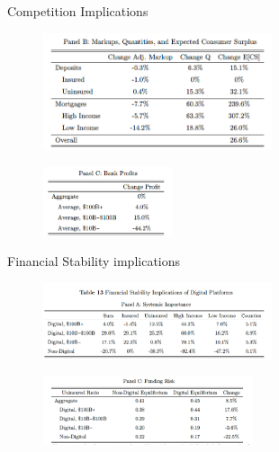 \documentclass[notes,10pt, aspectratio=169]{beamer}
\begin{document}
            \begin{frame}{Competition Implications}\label{comp_implications}   
                \begin{figure}
                    \centering
                    \includegraphics[width=0.6\textwidth]{imgs/tab12b.png}
                \end{figure}
                
                \begin{figure}
                    \centering
                    \includegraphics[width=0.34\textwidth]{imgs/tab12c.png}
                \end{figure}
            \end{frame}




            \begin{frame}{Financial Stability implications}\label{fin_stab}
                \begin{figure}
                    \centering
                    \includegraphics[width=0.6\textwidth]{imgs/tab13.png}
                \end{figure}
                
                \begin{figure}
                    \centering
                    \includegraphics[width=0.55\textwidth]{imgs/tab13c.png}
                \end{figure}
            \end{frame}
\end{document}

